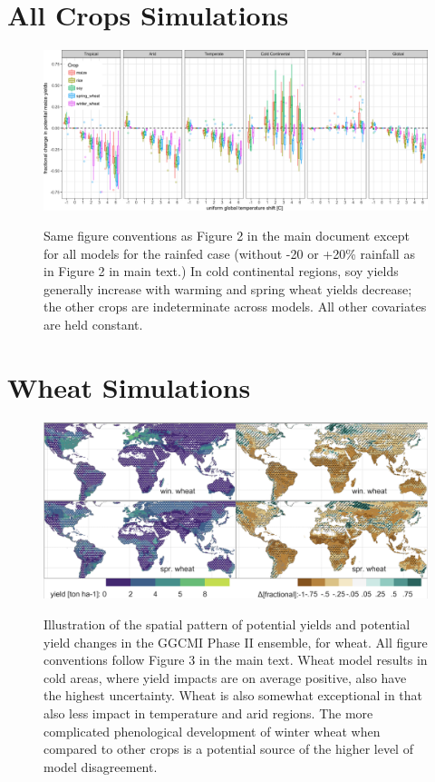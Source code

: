 \documentclass[10pt]{article}
\begin{document}
\section{All Crops Simulations}
\begin{figure}[h!]
\includegraphics[width=\textwidth]{s_sim_KG_crops_all.png}\\
\caption{Same figure conventions as Figure 2 in the main document except for all models for the rainfed case (without -20 or +20\% rainfall as in Figure 2 in main text.) In cold continental regions, soy yields generally increase with warming and spring wheat yields decrease; the other crops are indeterminate across models. All other covariates are held constant.}
\label{fig:KGcrops_all}
\end{figure}

\clearpage 
\section{Wheat Simulations}
\begin{figure}[h!]
\includegraphics[width=\textwidth]{s_wheat_baseline.png}\\
\caption{Illustration of the spatial pattern of potential yields and potential yield changes in the GGCMI Phase II ensemble, for wheat. All figure conventions follow Figure 3 in the main text. Wheat model results in cold areas, where yield impacts are on average positive, also have the highest uncertainty. Wheat is also somewhat exceptional in that  also less impact in temperature and arid regions. The more complicated phenological development of winter wheat when compared to other crops is a potential source of the higher level of model disagreement.}
\label{fig:wheatbaseline}
\end{figure}
\end{document}
